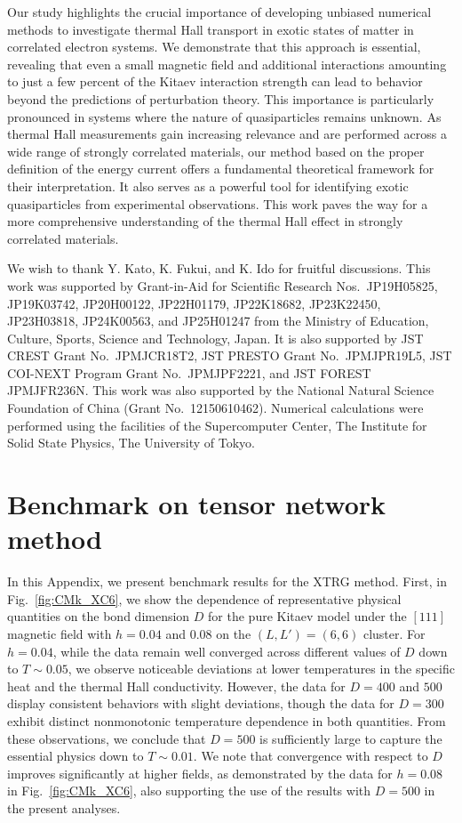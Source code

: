 \documentclass[twocolumn,superscriptaddress,showpacs, longbibliography, aps, prx]{revtex4-2}
\begin{document}
Our study highlights the crucial importance of developing unbiased numerical methods to investigate thermal Hall transport in exotic states of matter in correlated electron systems. 
We demonstrate that this approach is essential, revealing that even a small magnetic field and additional interactions amounting to just a few percent of the Kitaev interaction strength can lead to behavior beyond the predictions of perturbation theory. 
This importance is particularly pronounced in systems where the nature of quasiparticles remains unknown. 
As thermal Hall measurements gain increasing relevance and are performed across a wide range of strongly correlated materials, our method based on the proper definition of the energy current offers a fundamental theoretical framework for their interpretation. 
It also serves as a powerful tool for identifying exotic quasiparticles from experimental observations. This work paves the way for a more comprehensive understanding of the thermal Hall effect in strongly correlated materials.

\begin{acknowledgments}
We wish to thank Y. Kato, K. Fukui, and K. Ido for fruitful discussions.
This work was supported by  Grant-in-Aid for Scientific Research
Nos.~JP19H05825, JP19K03742, JP20H00122, 	JP22H01179, JP22K18682, JP23K22450, JP23H03818, JP24K00563, and JP25H01247 from the Ministry of Education, Culture, Sports, Science and Technology, Japan.
It is also supported by JST CREST Grant No.~JPMJCR18T2, JST PRESTO Grant No.~JPMJPR19L5, JST COI-NEXT Program Grant No.~JPMJPF2221, and JST FOREST JPMJFR236N. This work was also supported by the National Natural Science Foundation of China (Grant No.~12150610462). Numerical calculations were performed using the facilities of the Supercomputer Center, The Institute for Solid State Physics, The University of Tokyo.
\end{acknowledgments}

\appendix
\section{Benchmark on tensor network method}
\label{app:XTRG_Bench}
In this Appendix, we present benchmark results for the XTRG method. 
First, in Fig.~\ref{fig:CMk_XC6}, we show the dependence of representative physical quantities on the bond dimension $D$ for the pure Kitaev model under the $[111]$ magnetic field with $h=0.04$ and $0.08$ on the $(L, L') = (6, 6)$ cluster.
For $h=0.04$, while the data remain well converged across different values of $D$ down to $T\sim 0.05$, we observe noticeable deviations at lower temperatures in the specific heat and the thermal Hall conductivity. 
However, the data for $D=400$ and $500$ display consistent behaviors with slight deviations, though the data for $D=300$ exhibit distinct nonmonotonic temperature dependence in both quantities. 
From these observations, we conclude that $D=500$ is sufficiently large to capture the essential physics down to $T\sim 0.01$. 
We note that convergence with respect to $D$ improves significantly at higher fields, as demonstrated by the data for $h=0.08$ in Fig.~\ref{fig:CMk_XC6}, also supporting the use of the results with $D=500$ in the present analyses. 
\end{document}
